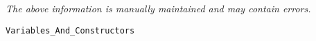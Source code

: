 \label{pkg:variables\_and\_constructors}

{\tiny \it The above information is manually maintained and may contain errors.}
\begin{verbatim}
Variables_And_Constructors
\end{verbatim}
